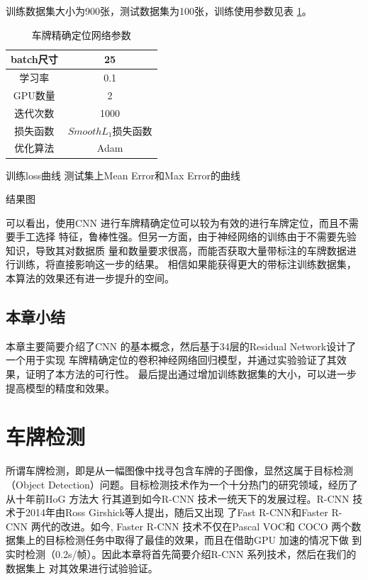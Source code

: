 训练数据集大小为900张，测试数据集为100张，训练使用参数见表 \ref{Tab:LocationArgs}。

\begin{table}[ht]
\centering
\caption{车牌精确定位网络参数}\label{Tab:LocationArgs}
\begin{tabular}{|c|c|}
\hline
batch尺寸 & 25 \\
\hline
学习率 & 0.1 \\
\hline
GPU数量 & 2 \\
\hline
迭代次数 & 1000 \\
\hline
损失函数 & $Smooth L_1$损失函数 \\
\hline
优化算法 & Adam\cite{Kingma:2014us} \\
\hline
\end{tabular}
\end{table}

训练loss曲线
测试集上Mean Error和Max Error的曲线

结果图

可以看出，使用CNN 进行车牌精确定位可以较为有效的进行车牌定位，而且不需要手工选择
特征，鲁棒性强。但另一方面，由于神经网络的训练由于不需要先验知识，导致其对数据质
量和数量要求很高，而能否获取大量带标注的车牌数据进行训练，将直接影响这一步的结果。
相信如果能获得更大的带标注训练数据集，本算法的效果还有进一步提升的空间。

\section{本章小结}

本章主要简要介绍了CNN 的基本概念，然后基于34层的Residual Network设计了一个用于实现
车牌精确定位的卷积神经网络回归模型，并通过实验验证了其效果，证明了本方法的可行性。
最后提出通过增加训练数据集的大小，可以进一步提高模型的精度和效果。

\chapter{车牌检测}

所谓车牌检测，即是从一幅图像中找寻包含车牌的子图像，显然这属于目标检测（Object
Detection）问题。目标检测技术作为一个十分热门的研究领域，经历了从十年前HoG 方法大
行其道到如今R-CNN 技术一统天下的发展过程。R-CNN 技术于2014年由Ross Girshick等人提出，随后又出现
了Fast R-CNN和Faster R-CNN 两代的改进。如今, Faster R-CNN 技术不仅在Pascal VOC和
COCO 两个数据集上的目标检测任务中取得了最佳的效果，而且在借助GPU 加速的情况下做
到实时检测（0.2s/帧）。因此本章将首先简要介绍R-CNN 系列技术，然后在我们的数据集上
对其效果进行试验验证。

